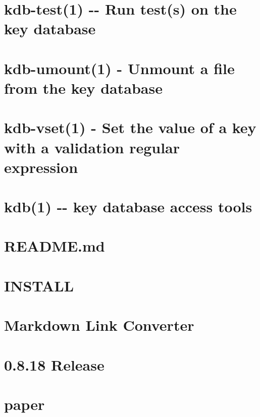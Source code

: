 \documentclass[twoside]{book}
\newcommand{\+}{\discretionary{\mbox{\scriptsize$\hookleftarrow$}}{}{}}
\begin{document}
\chapter{kdb-\/test(1) -\/-\/ Run test(s) on the key database}
\label{md_doc_help_kdb-test}
\hypertarget{md_doc_help_kdb-test}{}

\chapter{kdb-\/umount(1) -\/ Unmount a file from the key database}
\label{md_doc_help_kdb-umount}
\hypertarget{md_doc_help_kdb-umount}{}

\chapter{kdb-\/vset(1) -\/ Set the value of a key with a validation regular expression}
\label{md_doc_help_kdb-vset}
\hypertarget{md_doc_help_kdb-vset}{}

\chapter{kdb(1) -\/-\/ key database access tools}
\label{md_doc_help_kdb}
\hypertarget{md_doc_help_kdb}{}

\chapter{R\+E\+A\+D\+M\+E.\+md}
\label{doc_images_README_md}
\hypertarget{doc_images_README_md}{}

\chapter{I\+N\+S\+T\+A\+L\+L}
\label{doc_INSTALL_md}
\hypertarget{doc_INSTALL_md}{}

\chapter{Markdown Link Converter}
\label{doc_markdownlinkconverter_README_md}
\hypertarget{doc_markdownlinkconverter_README_md}{}

\chapter{0.8.18 Release}
\label{doc_NEWS_md}
\hypertarget{doc_NEWS_md}{}

\chapter{paper}
\label{md_doc_paper_paper}
\hypertarget{md_doc_paper_paper}{}

\end{document}
